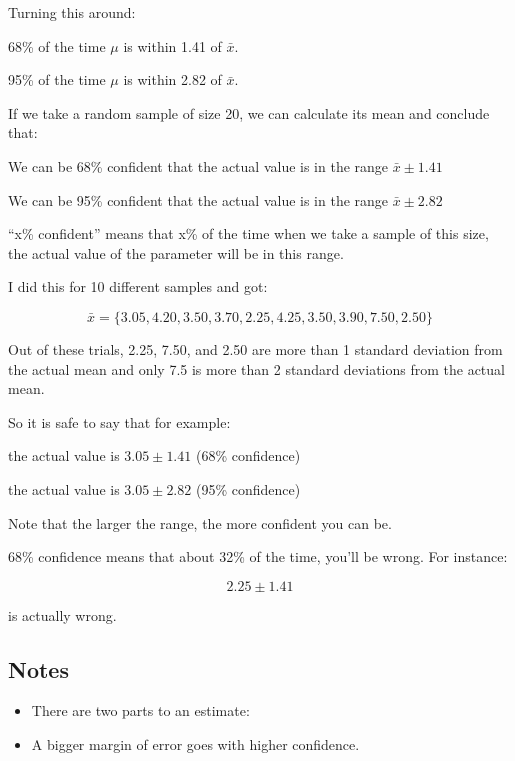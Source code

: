 \documentclass[letterpaper, landscape]{exam}
\begin{document}
  Turning this around:
  \begin{itemize*}
    \item 68\% of the time $\mu$ is within 1.41 of $\bar{x}$.
    \item 95\% of the time $\mu$ is within 2.82 of $\bar{x}$.
  \end{itemize*}

  If we take a random sample of size 20, we can calculate its mean and conclude
  that:
  \begin{itemize*}
    \item We can be 68\% confident that the actual value is in the range
      $\bar{x} \pm 1.41$
    \item We can be 95\% confident that the actual value is in the range
      $\bar{x} \pm 2.82$
  \end{itemize*}

  ``x\% confident'' means that x\% of the time when we take a sample of this
  size, the actual value of the parameter will be in this range.

  I did this for 10 different samples and got:

  \[
    \bar{x} = \{ 3.05, 4.20, 3.50, 3.70, 2.25, 4.25, 3.50, 3.90, 7.50, 2.50 \}
  \]

  Out of these trials, 2.25, 7.50, and 2.50 are more than 1 standard deviation
  from the actual mean and only 7.5 is more than 2 standard deviations from the
  actual mean.

  So it is safe to say that for example:
  \begin{itemize*}
    \item the actual value is $3.05 \pm 1.41$ (68\% confidence)
    \item the actual value is $3.05 \pm 2.82$ (95\% confidence)
  \end{itemize*}

  Note that the larger the range, the more confident you can be. 
  
  68\% confidence means that about 32\% of the time, you'll be wrong. For
  instance:

  \[
    2.25 \pm 1.41
  \] 

  is actually wrong.

  \subsection{Notes}

  \begin{itemize}
    \item There are two parts to an estimate:

    \item A bigger margin of error goes with higher confidence.

  \end{itemize}
\end{document}
